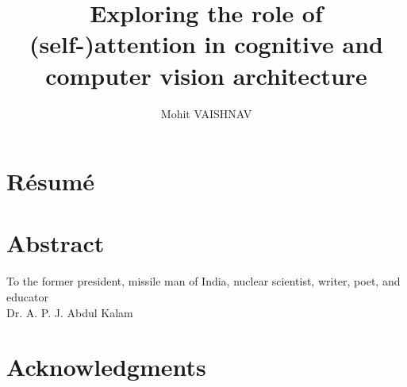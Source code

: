 \documentclass[12pt,oneside]{book}
\title{\textbf{\large Exploring the role of (self-)attention in cognitive and computer vision architecture}}
\author{Mohit VAISHNAV}
\begin{document}
    \makeflyleaf

\pagestyle{fancy}

\fancyhead{}

\renewcommand{\chaptermark}[1]{\markboth{\textsc{#1}}{}}

\setlength{\headheight}{14.49998pt}
\addtolength{\topmargin}{-2.49998pt}

\frontmatter

\dominitoc%

\chapter*{R\'esum\'e}


\chapter*{Abstract}


\clearpage
\begin{center}
    \thispagestyle{empty}
    \vspace*{\fill}
    To the former president, missile man of India, nuclear scientist, writer, poet, and educator \\
    Dr. A. P. J. Abdul Kalam
    \vspace*{\fill}
\end{center}
\clearpage

\sloppy

\chapter*{Acknowledgments}


\setcounter{page}{6}

{}
\tableofcontents
\newpage
\cleardoublepage

\setcounter{page}{9}

{}
\listoffigures
\newpage
\cleardoublepage

\setcounter{page}{16}

{}
\listoftables
\newpage
\cleardoublepage


\mainmatter

\setlength{\parskip}{.7em}

\titlespacing*{\section}{0pt}{.9em}{.8em}
\renewcommand{\baselinestretch}{1.1}
\end{document}
